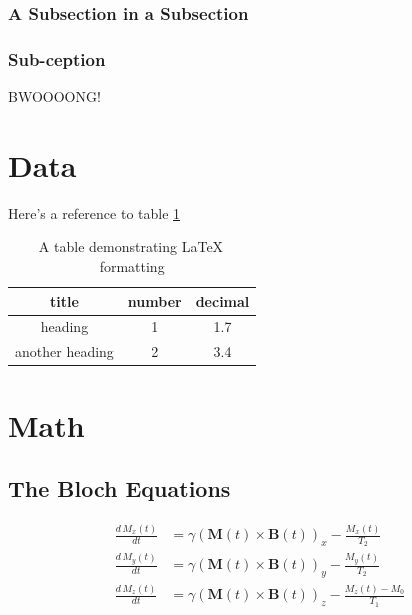 \documentclass{workreport}
\begin{document}
\begin{body}
\subsubsection{A Subsection in a Subsection}

	\lipsum[1]

\subsubsection{Sub-ception}

	\lipsum[1]

	BWOOOONG!

\section{Data}

	\lipsum[1-2]
	
Here's a reference to table \ref{tbl:exampletable}

\begin{table}
	\centering
	\begin{tabular}{|c|c|c|} \hline
		title & number & decimal \\ \hline
		heading & 1 & 1.7 \\ \hline
		another heading & 2 & 3.4 \\ \hline
	\end{tabular}
	\caption{A table demonstrating \LaTeX \, formatting}
	\label{tbl:exampletable}
\end{table}

\section{Math}

\lipsum[1]

\subsection{The Bloch Equations}

	\begin{align}
		\frac{d\, M_x(t)}{dt} &= \gamma(\mathbf{M}(t) \times \mathbf{B}(t))_x - \frac{M_x(t)}{T_2} \\
		\frac{d\, M_y(t)}{dt} &= \gamma(\mathbf{M}(t) \times \mathbf{B}(t))_y - \frac{M_y(t)}{T_2} \\
		\frac{d\, M_z(t)}{dt} &= \gamma(\mathbf{M}(t) \times \mathbf{B}(t))_z - \frac{M_z(t) - M_0}{T_1}
	\end{align}


\end{body}
\end{document}
